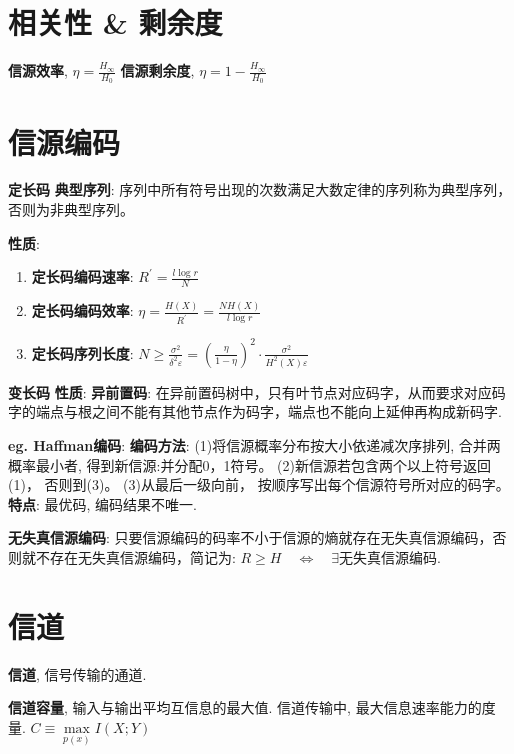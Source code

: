 \documentclass{article}
\newcommand{\env}[2]{\begin{#1}#2\end{#1}}
\newcommand{\defi}[2]{\textbf{#1}, #2}
\begin{document}
    \section{相关性 \& 剩余度}
        \defi{信源效率}{$\eta = \frac{H_\infty}{H_0}$}
        \defi{信源剩余度}{$\eta = 1 - \frac{H_\infty}{H_0}$}
            
    \section{信源编码}
        \textbf{定长码}
            \textbf{典型序列}: 序列中所有符号出现的次数满足大数定律的序列称为典型序列，否则为非典型序列。

            \textbf{性质}:
                \env{enumerate}{
                \item \textbf{定长码编码速率}: $R^{\prime}=\frac{l \log r}{N}$
                \item \textbf{定长码编码效率}: $\eta=\frac{H(X)}{R^{\prime}}=\frac{N H(X)}{l \log r}$
                \item \textbf{定长码序列长度}: $N \geqslant \frac{\sigma^2}{\delta^2 \varepsilon}=\left(\frac{\eta}{1-\eta}\right)^2 \cdot \frac{\sigma^2}{H^2(X) \varepsilon}$
                }


        \textbf{变长码}  
            \textbf{性质}:
                \textbf{异前置码}: 在异前置码树中，只有叶节点对应码字，从而要求对应码字的端点与根之间不能有其他节点作为码字，端点也不能向上延伸再构成新码字.
                

            \textbf{eg. Haffman编码}:
                \textbf{编码方法}:
                    (1)将信源概率分布按大小依递减次序排列, 合并两概率最小者, 得到新信源:并分配0，1符号。
                    (2)新信源若包含两个以上符号返回(1)， 否则到(3)。
                    (3)从最后一级向前， 按顺序写出每个信源符号所对应的码字。
                \textbf{特点}:
                    最优码, 编码结果不唯一.
                    
        \textbf{无失真信源编码}: 只要信源编码的码率不小于信源的熵就存在无失真信源编码，否则就不存在无失真信源编码，简记为: $ R \ge H \quad \Leftrightarrow  \quad \exists \text{无失真信源编码}$.
        

\section{信道}
    \defi{信道}{信号传输的通道.}

    \defi{信道容量}{输入与输出平均互信息的最大值. 信道传输中, 最大信息速率能力的度量. $C \equiv \max\limits_{p(x)} I(X ; Y)$}
    
\end{document}
